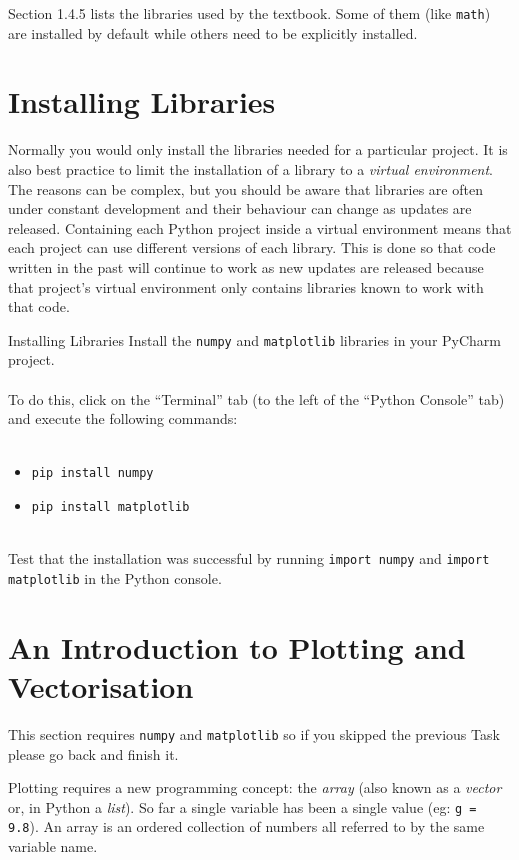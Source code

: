 \documentclass{lab}
\begin{document}
Section 1.4.5 lists the libraries used by the textbook. Some of them (like \texttt{math}) are installed by default while others need to be explicitly installed.

\pagebreak
\section{Installing Libraries}

Normally you would only install the libraries needed for a particular project. It is also best practice to limit the installation of a library to a \textit{virtual environment}. The reasons can be complex, but you should be aware that libraries are often under constant development and their behaviour can change as updates are released. Containing each Python project inside a virtual environment means that each project can use different versions of each library. This is done so that code written in the past will continue to work as new updates are released because that project's virtual environment only contains libraries known to work with that code.

\begin{task}{Installing Libraries}{}
Install the \texttt{numpy} and \texttt{matplotlib} libraries in your PyCharm project.
\\~\\
To do this, click on the ``Terminal'' tab (to the left of the ``Python Console'' tab) and execute the following commands:
\\~
\begin{itemize}
\item \texttt{pip install numpy}
\item \texttt{pip install matplotlib}
\end{itemize}
~\\
Test that the installation was successful by running \texttt{import numpy} and \texttt{import matplotlib} in the Python console.
\end{task}

\section{An Introduction to Plotting and Vectorisation}

This section requires \texttt{numpy} and \texttt{matplotlib} so if you skipped the previous Task please go back and finish it.

Plotting requires a new programming concept: the \textit{array} (also known as a \textit{vector} or, in Python a \textit{list}). So far a single variable has been a single value (eg: \texttt{g = 9.8}). An array is an ordered collection of numbers all referred to by the same variable name.
\end{document}
